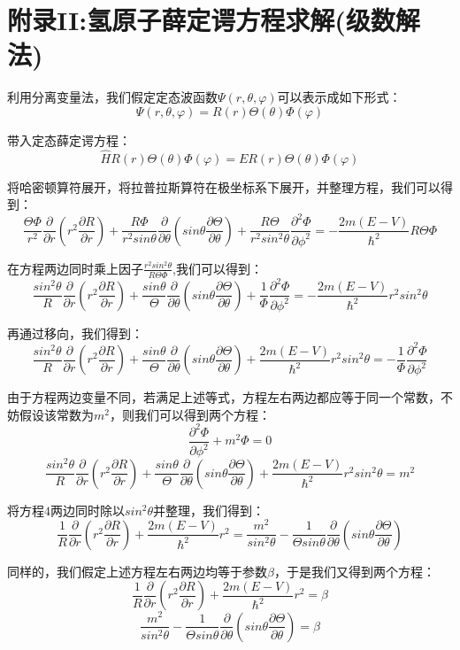\section{附录II:氢原子薛定谔方程求解(级数解法)}
利用分离变量法，我们假定定态波函数$\varPsi(r,\theta,\varphi)$可以表示成如下形式：
\[\varPsi(r,\theta,\varphi)=R(r)\Theta(\theta)\varPhi(\varphi)\]

带入定态薛定谔方程：
\[\hat{H}R(r)\Theta(\theta)\varPhi(\varphi)=ER(r)\Theta(\theta)\varPhi(\varphi)\]

将哈密顿算符展开，将拉普拉斯算符在极坐标系下展开，并整理方程，我们可以得到：
\[\frac{\Theta\varPhi}{r^2}\frac{\partial}{\partial{r}}(r^2\frac{\partial R}{\partial{r}})+\frac{R\varPhi}{r^2sin\theta}\frac{\partial}{\partial{\theta}}(sin\theta\frac{\partial \Theta}{\partial{\theta}})+\frac{R\Theta}{r^2sin^2 \theta }\frac{\partial^2 \varPhi}{\partial{\phi^2}}=-\frac{2m(E-V)}{\hbar^2}R\Theta\varPhi\]

在方程两边同时乘上因子$\frac{r^2sin^2 \theta}{R\Theta\varPhi}$,我们可以得到：
\[\frac{sin^2 \theta}{R}\frac{\partial}{\partial{r}}(r^2\frac{\partial R}{\partial{r}})+\frac{sin\theta}{\Theta}\frac{\partial}{\partial{\theta}}(sin\theta\frac{\partial \Theta}{\partial{\theta}})+\frac{1}{\varPhi}\frac{\partial^2 \varPhi}{\partial{\phi^2}}=-\frac{2m(E-V)}{\hbar^2}r^2sin^2 \theta\]

再通过移向，我们得到：
\[\frac{sin^2 \theta}{R}\frac{\partial}{\partial{r}}(r^2\frac{\partial R}{\partial{r}})+\frac{sin\theta}{\Theta}\frac{\partial}{\partial{\theta}}(sin\theta\frac{\partial \Theta}{\partial{\theta}})+\frac{2m(E-V)}{\hbar^2}r^2sin^2 \theta=-\frac{1}{\varPhi}\frac{\partial^2 \varPhi}{\partial{\phi^2}}\]

由于方程两边变量不同，若满足上述等式，方程左右两边都应等于同一个常数，不妨假设该常数为$m^2$，则我们可以得到两个方程：
\[\frac{\partial^2 \varPhi}{\partial{\phi^2}}+m^2\varPhi=0 \tag{a}\]
\[\frac{sin^2 \theta}{R}\frac{\partial}{\partial{r}}(r^2\frac{\partial R}{\partial{r}})+\frac{sin\theta}{\Theta}\frac{\partial}{\partial{\theta}}(sin\theta\frac{\partial \Theta}{\partial{\theta}})+\frac{2m(E-V)}{\hbar^2}r^2sin^2 \theta=m^2 \tag{4}\]

将方程$4$两边同时除以$sin^2 \theta$并整理，我们得到：
\[\frac{1}{R}\frac{\partial}{\partial{r}}(r^2\frac{\partial R}{\partial{r}})+\frac{2m(E-V)}{\hbar^2}r^2=\frac{m^2}{sin^2 \theta}-\frac{1}{\Theta sin\theta}\frac{\partial}{\partial{\theta}}(sin\theta\frac{\partial \Theta}{\partial{\theta}})\]

同样的，我们假定上述方程左右两边均等于参数$\beta$，于是我们又得到两个方程：
\[\frac{1}{R}\frac{\partial}{\partial{r}}(r^2\frac{\partial R}{\partial{r}})+\frac{2m(E-V)}{\hbar^2}r^2=\beta \tag{b}\]
\[\frac{m^2}{sin^2 \theta}-\frac{1}{\Theta sin\theta}\frac{\partial}{\partial{\theta}}(sin\theta\frac{\partial \Theta}{\partial{\theta}})=\beta \tag{c}\]

